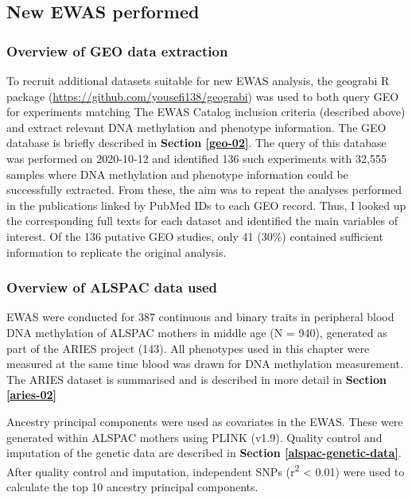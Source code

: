\documentclass[11pt,oneside]{bristolthesis}
\begin{document}
\hypertarget{new-ewas-03}{%
\subsection{New EWAS performed}\label{new-ewas-03}}

\hypertarget{geo-data-extraction}{%
\subsubsection{Overview of GEO data extraction}\label{geo-data-extraction}}

To recruit additional datasets suitable for new EWAS analysis, the geograbi R package (\url{https://github.com/yousefi138/geograbi}) was used to both query GEO for experiments matching The EWAS Catalog inclusion criteria (described above) and extract relevant DNA methylation and phenotype information. The GEO database is briefly described in \textbf{Section \ref{geo-02}}. The query of this database was performed on 2020-10-12 and identified 136 such experiments with 32,555 samples where DNA methylation and phenotype information could be successfully extracted. From these, the aim was to repeat the analyses performed in the publications linked by PubMed IDs to each GEO record. Thus, I looked up the corresponding full texts for each dataset and identified the main variables of interest. Of the 136 putative GEO studies, only 41 (30\%) contained sufficient information to replicate the original analysis.

\hypertarget{alspac-03}{%
\subsubsection{Overview of ALSPAC data used}\label{alspac-03}}

EWAS were conducted for 387 continuous and binary traits in peripheral blood DNA methylation of ALSPAC mothers in middle age (N = 940), generated as part of the ARIES project (143). All phenotypes used in this chapter were measured at the same time blood was drawn for DNA methylation measurement. The ARIES dataset is summarised and is described in more detail in \textbf{Section \ref{aries-02}}

Ancestry principal components were used as covariates in the EWAS. These were generated within ALSPAC mothers using PLINK (v1.9). Quality control and imputation of the genetic data are described in \textbf{Section \ref{alspac-genetic-data}}. After quality control and imputation, independent SNPs (r\textsuperscript{2} \textless{} 0.01) were used to calculate the top 10 ancestry principal components.
\end{document}

